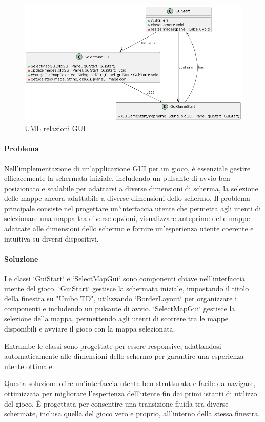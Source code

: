 \documentclass[a4paper,12pt]{report}
\begin{document}
\begin{figure}[H]
    \centering
    \includegraphics[scale=0.8]{Gui}
    \caption{UML relazioni GUI}
    \label{fig:gui}
\end{figure}

\paragraph{Problema} Nell'implementazione di un'applicazione GUI per un gioco, è essenziale gestire efficacemente la schermata iniziale, includendo un pulsante di avvio ben posizionato e scalabile per adattarsi a diverse dimensioni di scherma, la selezione delle mappe ancora adattabile a diverse dimensioni dello schermo. Il problema principale consiste nel progettare un'interfaccia utente che permetta agli utenti di selezionare una mappa tra diverse opzioni, visualizzare anteprime delle mappe adattate alle dimensioni dello schermo e fornire un'esperienza utente coerente e intuitiva su diversi dispositivi.
\paragraph{Soluzione} Le classi `GuiStart` e `SelectMapGui` sono componenti chiave nell'interfaccia utente del gioco. `GuiStart` gestisce la schermata iniziale, impostando il titolo della finestra su "Unibo TD", utilizzando `BorderLayout` per organizzare i componenti e includendo un pulsante di avvio. `SelectMapGui` gestisce la selezione della mappa, permettendo agli utenti di scorrere tra le mappe disponibili e avviare il gioco con la mappa selezionata.

Entrambe le classi sono progettate per essere responsive, adattandosi automaticamente alle dimensioni dello schermo per garantire una esperienza utente ottimale.

Questa soluzione offre un'interfaccia utente ben strutturata e facile da navigare, ottimizzata per migliorare l'esperienza dell'utente fin dai primi istanti di utilizzo del gioco. È progettata per consentire una transizione fluida tra diverse schermate, inclusa quella del gioco vero e proprio, all'interno della stessa finestra.
\end{document}
